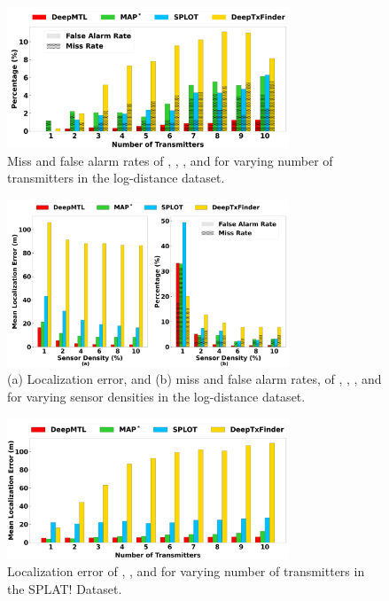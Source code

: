 \begin{figure}[t]
	\centering
	\includegraphics[width=0.75\textwidth]{chapters/wowmom-pmc/figures/log_distance-missfalse_vary_numintru.png}
	\caption{Miss and false alarm rates of \our, \map, \splot, and \deeptx for varying number of transmitters in the log-distance dataset.}
	\label{fig:logdist-missfalse-vary-numintru}
\end{figure}


\begin{figure}[t]
	\centering
	\includegraphics[width=0.75\textwidth]{chapters/wowmom-pmc/figures/log_distance-error_missfalse_vary_sendensity.png}
	\caption{(a) Localization error, and (b) miss and false alarm rates, of \our, \map, \splot, and \deeptx for varying sensor densities in the log-distance dataset.}
	\label{fig:logdist-error_missfalse-vary-sendensity}
\end{figure}






\begin{figure}[ht]
	\centering
	\includegraphics[width=0.75\textwidth]{chapters/wowmom-pmc/figures/splat-error_vary_numintru.png}
	\caption{Localization error of \our, \map, \deeptx and \splot for varying number of transmitters in the SPLAT! Dataset. }
	\label{fig:splat-error-vary_numintru}
\end{figure}


